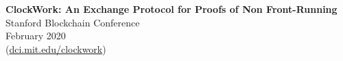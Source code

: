 
\textbf{ClockWork: An Exchange Protocol for Proofs of Non Front-Running} \\
Stanford Blockchain Conference \\
February 2020 \\
(\href{https://dci.mit.edu/clockwork}{dci.mit.edu/clockwork})

